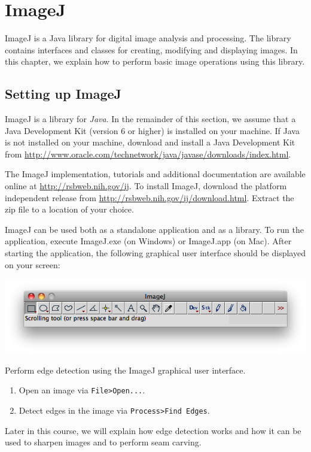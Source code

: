 \documentclass{book}
\begin{document}
\chapter{ImageJ}
ImageJ is a Java library for digital image analysis and processing. The library contains interfaces and classes for creating, modifying and displaying images. In this chapter, we explain how to perform basic image operations using this library.

\section{Setting up ImageJ}
ImageJ is a library for \emph{Java}. In the remainder of this section, we assume that a Java Development Kit (version 6 or higher) is installed on your machine. If Java is not installed on your machine, download and install a Java Development Kit from \href{http://www.oracle.com/technetwork/java/javase/downloads/index.html}{http://www.oracle.com/technetwork/java/javase/downloads/index.html}.

The ImageJ implementation, tutorials and additional documentation are available online at \href{http://rsbweb.nih.gov/ij}{http://rsbweb.nih.gov/ij}. To install ImageJ, download the platform independent release from \href{http://rsbweb.nih.gov/ij/download.html}{http://rsbweb.nih.gov/ij/download.html}. Extract the zip file to a location of your choice.

ImageJ can be used both as a standalone application and as a library. To run the application,  execute ImageJ.exe (on Windows) or ImageJ.app (on Mac). After starting the application, the following graphical user interface should be displayed on your screen:

\includegraphics[scale=0.5]{ImageJ-screenshot.png}

\begin{exercise}
Perform edge detection using the ImageJ graphical user interface.
\begin{enumerate}
  \item Open an image via \texttt{File>Open...}.
  \item Detect edges in the image via \texttt{Process>Find Edges}.
\end{enumerate} 
Later in this course, we will explain how edge detection works and how it can be used to sharpen images and to perform seam carving.
\end{exercise}
\end{document}
